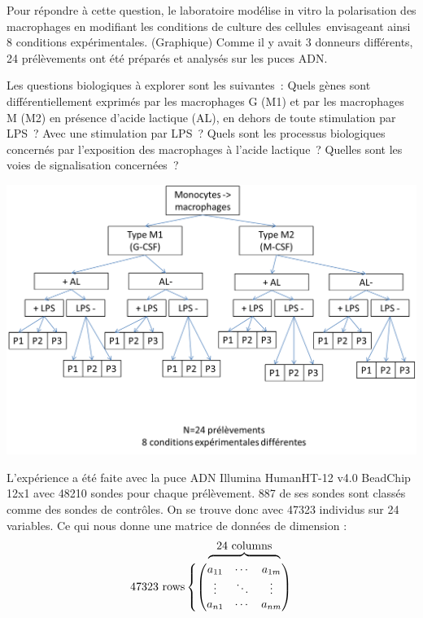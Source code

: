 \documentclass[a4paper,10pt]{article}
\begin{document}
Pour répondre à cette question, le laboratoire modélise in vitro la polarisation des macrophages en modifiant les conditions de culture des cellules envisageant ainsi 8 conditions expérimentales. (Graphique) Comme il y avait 3 donneurs différents, 24 prélèvements ont été préparés et analysés sur les puces ADN.

Les questions biologiques à explorer sont les suivantes : Quels gènes sont différentiellement exprimés par les macrophages  G (M1) et par les macrophages M (M2) en présence d’acide lactique (AL), en dehors de toute stimulation par LPS ? Avec une stimulation par LPS ? Quels sont les processus biologiques concernés par l’exposition des macrophages à l’acide lactique ? Quelles sont les voies de signalisation concernées ?
\begin{center}
 \includegraphics[scale=0.5]{./image/plan.png}
\end{center}
L’expérience a été faite avec la puce ADN  Illumina HumanHT-12 v4.0 BeadChip 12x1 avec 48210 sondes pour chaque prélèvement.
887 de ses sondes sont classés comme des sondes de contrôles.
On se trouve donc avec 47323 individus sur 24 variables. 
Ce qui nous donne une matrice de données de dimension :
\def\tmp{
  \begin{pmatrix}
  a_{11} & \cdots & a_{1m} \\

   \vdots & \ddots &\vdots \\

   a_{n1} & \cdots & a_{nm} 
 \end{pmatrix}
}
\[
\stackMath\def\stackalignment{r}
  \stackon
    {\mathrm{47323~rows}\left\{\tmp\right.}
    {\overbrace{\phantom{\smash{\tmp\mkern -36mu}}}^{\mathrm{\textstyle 24~columns}}\mkern 20mu}
\]
\end{document}
